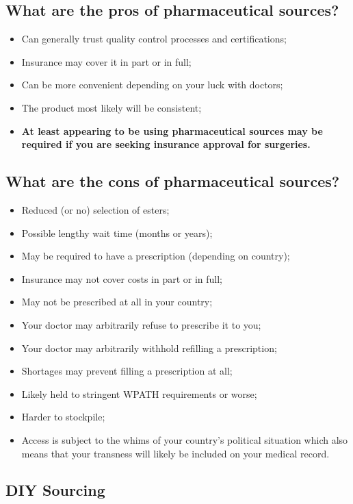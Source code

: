 \documentclass{article}
\begin{document}
\subsection{What are the pros of pharmaceutical sources?}

\begin{itemize}
  \item Can generally trust quality control processes and certifications;
  \item Insurance may cover it in part or in full;
  \item Can be more convenient depending on your luck with doctors;
  \item The product most likely will be consistent;
  \item \textbf{At least appearing to be using pharmaceutical sources may be required if you are seeking insurance approval for surgeries.}
\end{itemize}

\subsection{What are the cons of pharmaceutical sources?}

\begin{itemize}
  \item Reduced (or no) selection of esters;
  \item Possible lengthy wait time (months or years);
  \item May be required to have a prescription (depending on country);
  \item Insurance may not cover costs in part or in full;
  \item May not be prescribed at all in your country;
  \item Your doctor may arbitrarily refuse to prescribe it to you;
  \item Your doctor may arbitrarily withhold refilling a prescription;
  \item Shortages may prevent filling a prescription at all;
  \item Likely held to stringent WPATH requirements or worse;
  \item Harder to stockpile;
  \item Access is subject to the whims of your country’s political situation which also means that your transness will likely be included on your medical record.
\end{itemize}

\subsection*{DIY Sourcing}
\end{document}
